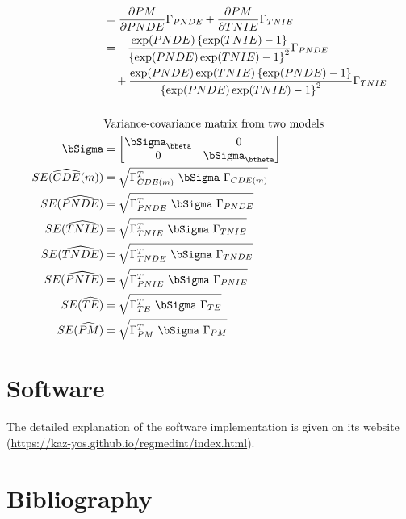 \documentclass[dvipdfmx,10pt]{article}
\begin{document}
\begin{align*}
  &= \frac{\partial PM}{\partial PNDE}\Gamma_{PNDE} + \frac{\partial PM}{\partial TNIE}\Gamma_{TNIE}\\
  &= - \frac{\exp(PNDE)\left\{ \exp(TNIE) - 1 \right\}}{\left\{ \exp(PNDE)\exp(TNIE) - 1 \right\}^{2}} \Gamma_{PNDE}\\
  &~~~ + \frac{\exp(PNDE)\exp(TNIE)\left\{ \exp(PNDE) - 1 \right\}}{\left\{ \exp(PNDE)\exp(TNIE) - 1 \right\}^{2}} \Gamma_{TNIE}\\
  \\
  &\text{Variance-covariance matrix from two models}\\
  \bSigma &=
           \begin{bmatrix}
             \bSigma_{\bbeta} & 0 \\
             0 & \bSigma_{\btheta} \\
           \end{bmatrix}\\
  SE(\widehat{CDE}(m)) &= \sqrt{\Gamma_{CDE(m)}^{T} ~\bSigma~ \Gamma_{CDE(m)}}\\
  SE(\widehat{PNDE}) &= \sqrt{\Gamma_{PNDE}^{T} ~\bSigma~ \Gamma_{PNDE}}\\
  SE(\widehat{TNIE}) &= \sqrt{\Gamma_{TNIE}^{T} ~\bSigma~ \Gamma_{TNIE}}\\
  SE(\widehat{TNDE}) &= \sqrt{\Gamma_{TNDE}^{T} ~\bSigma~ \Gamma_{TNDE}}\\
  SE(\widehat{PNIE}) &= \sqrt{\Gamma_{PNIE}^{T} ~\bSigma~ \Gamma_{PNIE}}\\
  SE(\widehat{TE}) &= \sqrt{\Gamma_{TE}^{T} ~\bSigma~ \Gamma_{TE}}\\
  SE(\widehat{PM}) &= \sqrt{\Gamma_{PM}^{T} ~\bSigma~ \Gamma_{PM}}\\
\end{align*}


\section{Software}
\label{sec:org45087dc}
The detailed explanation of the software implementation is given on its website (\url{https://kaz-yos.github.io/regmedint/index.html}).

\section{Bibliography}
\label{sec:orgf6c8ae1}
\renewcommand{\section}[2]{}



\end{document}
